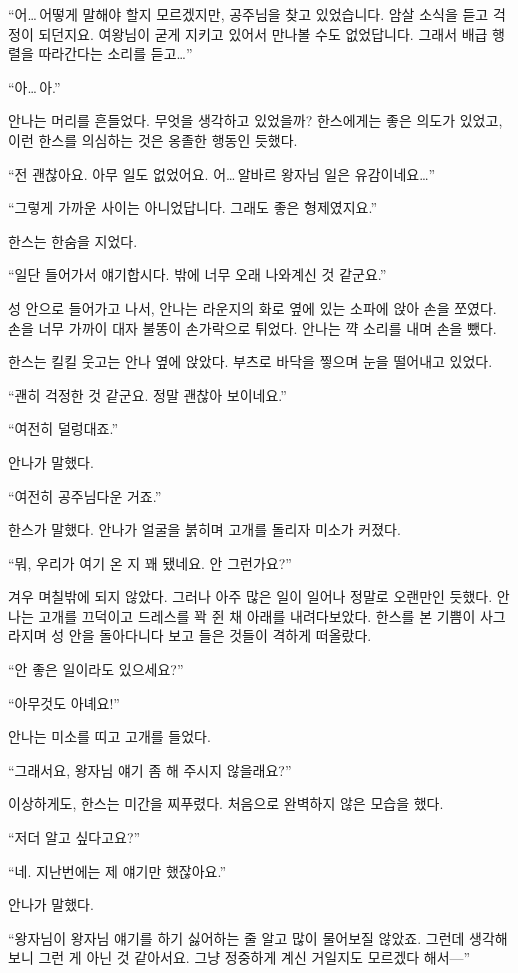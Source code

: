 ``어\ldots\,어떻게 말해야 할지 모르겠지만, 공주님을 찾고 있었습니다. 암살 소식을 듣고 걱정이 되던지요. 여왕님이 굳게 지키고 있어서 만나볼 수도 없었답니다. 그래서 배급 행렬을 따라간다는 소리를 듣고\ldots''

``아\ldots\,아.''

안나는 머리를 흔들었다. 무엇을 생각하고 있었을까? 한스에게는 좋은 의도가 있었고, 이런 한스를 의심하는 것은 옹졸한 행동인 듯했다.

``전 괜찮아요. 아무 일도 없었어요. 어\ldots\,알바르 왕자님 일은 유감이네요\ldots''

``그렇게 가까운 사이는 아니었답니다. 그래도 좋은 형제였지요.''

한스는 한숨을 지었다.

``일단 들어가서 얘기합시다. 밖에 너무 오래 나와계신 것 같군요.''

성 안으로 들어가고 나서, 안나는 라운지의 화로 옆에 있는 소파에 앉아 손을 쪼였다. 손을 너무 가까이 대자 불똥이 손가락으로 튀었다. 안나는 꺅 소리를 내며 손을 뺐다.

한스는 킬킬 웃고는 안나 옆에 앉았다. 부츠로 바닥을 찧으며 눈을 떨어내고 있었다.

``괜히 걱정한 것 같군요. 정말 괜찮아 보이네요.''

``여전히 덜렁대죠.''

안나가 말했다.

``여전히 공주님다운 거죠.''

한스가 말했다. 안나가 얼굴을 붉히며 고개를 돌리자 미소가 커졌다.

``뭐, 우리가 여기 온 지 꽤 됐네요. 안 그런가요?''

겨우 며칠밖에 되지 않았다. 그러나 아주 많은 일이 일어나 정말로 오랜만인 듯했다. 안나는 고개를 끄덕이고 드레스를 꽉 쥔 채 아래를 내려다보았다. 한스를 본 기쁨이 사그라지며 성 안을 돌아다니다 보고 들은 것들이 격하게 떠올랐다.

``안 좋은 일이라도 있으세요?''

``아무것도 아녜요!''

안나는 미소를 띠고 고개를 들었다.

``그래서요, 왕자님 얘기 좀 해 주시지 않을래요?''

이상하게도, 한스는 미간을 찌푸렸다. 처음으로 완벽하지 않은 모습을 했다.

``저 더 알고 싶다고요?''

``네. 지난번에는 제 얘기만 했잖아요.''

안나가 말했다.

``왕자님이 왕자님 얘기를 하기 싫어하는 줄 알고 많이 물어보질 않았죠. 그런데 생각해보니 그런 게 아닌 것 같아서요. 그냥 정중하게 계신 거일지도 모르겠다 해서—''

